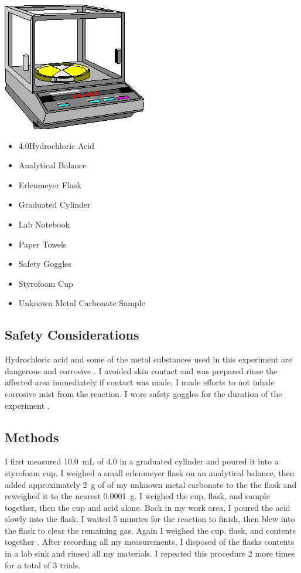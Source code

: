 \documentclass[
journal=aamick,
manuscript=article]{achemso}
\begin{document}
\vspace{15pt}
\includegraphics[scale=0.7]{balance.png}
\begin{itemize} \itemsep0pt \parskip0pt 
    \item \SI{4.0}{\Molar}Hydrochloric Acid
    \item Analytical Balance
    \item Erlenmeyer Flask
    \item Graduated Cylinder
    \item Lab Notebook
    \item Paper Towels
    \item Safety Goggles
    \item Styrofoam Cup
    \item Unknown Metal Carbonate Sample
\end{itemize}

\subsection{Safety Considerations}
Hydrochloric acid and some of the metal substances used in this experiment are dangerous and corrosive \cite{c}. I avoided skin contact and was prepared rinse the affected area immediately if contact was made. I made efforts to not inhale corrosive mist from the reaction. I wore safety goggles for the duration of the experiment \cite{a}.

\subsection{Methods}
I first measured \SI{10.0}{\milli\liter} of \SI{4.0}{\Molar} in a graduated cylinder and poured it into a styrofoam cup. I weighed a small erlenmeyer flask on an analytical balance, then added approximately \SI{2}{\gram} of of my unknown metal carbonate to the the flask and reweighed it to the nearest \SI{0.0001}{\gram}. I weighed the cup, flask, and sample together, then the cup and acid alone. Back in my work area, I poured the acid slowly into the flask. I waited 5 minutes for the reaction to finish, then blew into the flask to clear the remaining  gas. Again I weighed the cup, flask, and contents together \cite{b}. After recording all my measurements, I disposed of the flasks contents in a lab sink and rinsed all my materials. I repeated this procedure 2 more times for a total of 3 trials.
\end{document}

